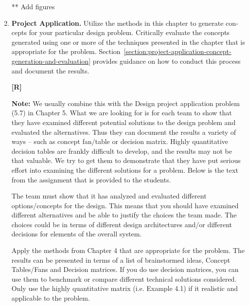 \begin{enumerate}
\begin{onlysolution}
      ** Add figures
  \end{onlysolution}

\item
  \textbf{Project Application.} Utilize the methods in this chapter to
  generate con­cepts for your particular design problem. Critically
  evaluate the concepts generated using one or more of the techniques
  presented in the chapter that is appropriate for the problem. 
  Section~\ref{section:project-application-concept-generation-and-evaluation}
  pro­vides guidance on how to conduct this process and document the
  results.

  \begin{onlysolution}
    \textbf{[R]}
    \itshape
    
    \textbf{Note:} We usually combine this with the Design project application problem (5.7) 
    in Chapter 5. What we are looking for is for each team to show that they have examined 
    different potential solutions to the design problem and evaluated the alternatives. 
    Thus they can document the results a variety of ways – such as concept fan/table or 
    decision matrix. Highly quantitative decision tables are frankly difficult to develop, 
    and the results may not be that valuable. We try to get them to demonstrate that they 
    have put serious effort into examining the different solutions for a problem. Below is 
    the text from the assignment that is provided to the students.

    The team must show that it has analyzed and evaluated different options/concepts for the 
    design. This means that you should have examined different alternatives and be able to 
    justify the choices the team made. The choices could be in terms of different design 
    architectures and/or different decisions for elements of the overall system.
    
    Apply the methods from Chapter 4 that are appropriate for the problem. The results can be 
    presented in terms of a list of brainstormed ideas, Concept Tables/Fans and Decision 
    matrices. If you do use decision matrices, you can use them to benchmark or compare different 
    technical solutions considered. Only use the highly quantitative matrix (i.e. Example 4.1) if 
    it realistic and applicable to the problem.
  \end{onlysolution}

\end{enumerate}

